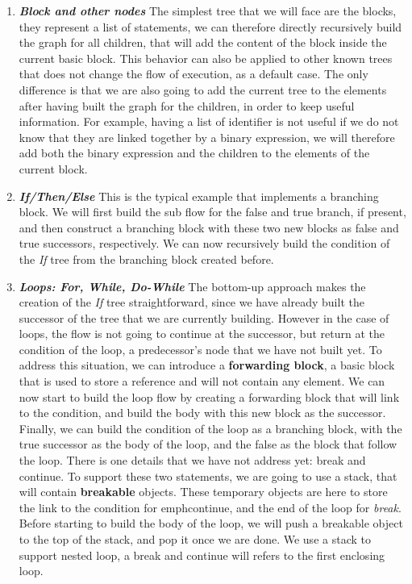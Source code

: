 \begin{enumerate}
	\item \textbf{\textit{Block and other nodes}} \newline 
	\label{subsubsec:block_and_others}
	The simplest tree that we will face are the blocks, they represent a list of statements, we can therefore directly recursively build the graph for all children, that will add the content of the block inside the current basic block. 
	This behavior can also be applied to other known trees that does not change the flow of execution, as a default case.
	The only difference is that we are also going to add the current tree to the elements after having built the graph for the children, in order to keep useful information. 
	For example, having a list of identifier is not useful if we do not know that they are linked together by a binary expression, we will therefore add both the binary expression and the children to the elements of the current block.
	
	\item \textbf{\textit{If/Then/Else}} \newline 
	\label{subsubsec:if_then_else}
	This is the typical example that implements a branching block. 
	We will first build the sub flow for the false and true branch, if present, and then construct a branching block with these two new blocks as false and true successors, respectively.
	We can now recursively build the condition of the \emph{If} tree from the branching block created before.
	
	\item \textbf{\textit{Loops: For, While, Do-While}} \newline 
	\label{subsubsec:loops_cfg}
	The bottom-up approach makes the creation of the \emph{If} tree straightforward, since we have already built the successor of the tree that we are currently building. 
	However in the case of loops, the flow is not going to continue at the successor, but return at the condition of the loop, a predecessor’s node that we have not built yet. 
	To address this situation, we can introduce a \textbf{forwarding block}, a basic block that is used to store a reference and will not contain any element.
	We can now start to build the loop flow by creating a forwarding block that will link to the condition, and build the body with this new block as the successor. 
	Finally, we can build the condition of the loop as a branching block, with the true successor as the body of the loop, and the false as the block that follow the loop.
	There is one details that we have not address yet: break and continue.
	To support these two statements, we are going to use a stack, that will contain \textbf{breakable} objects. 
	These temporary objects are here to store the link to the condition for emph{continue}, and the end of the loop for \emph{break}.
	Before starting to build the body of the loop, we will push a breakable object to the top of the stack, and pop it once we are done. 
	We use a stack to support nested loop, a break and continue will refers to the first enclosing loop.
	

\end{enumerate}
